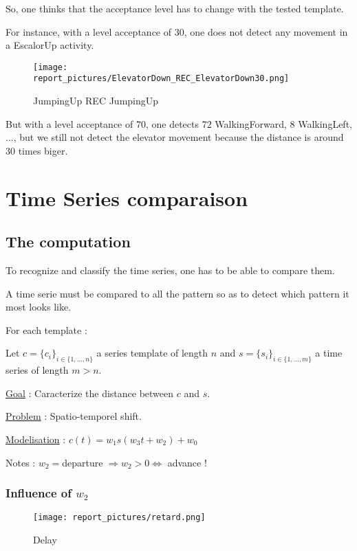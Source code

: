 \documentclass[a4,12pt]{article}
\begin{document}
	So, one thinks that the acceptance level has to change with the tested template. 
	
	For instance, with a level acceptance of $30$, one does not detect any movement in a EscalorUp activity.
	
	\begin{figure}[H]
		\centering
		\texttt{[image: report\_pictures/ElevatorDown\_REC\_ElevatorDown30.png]}
		\caption{JumpingUp REC JumpingUp}
		\label{JumpingUp_REC_JumpingUp}
	\end{figure}
	
	But with a level acceptance of $70$, one detects $72$ WalkingForward, $8$ WalkingLeft, ..., but we still not detect the elevator movement because the distance is around $30$ times biger.
	
	\section{Time Series comparaison}
	
	\subsection{The computation}
	
	To recognize and classify the time series, one has to be able to compare them.
	
	A time serie must be compared to all the pattern so as to detect which pattern it most looks like.
	
	For each template :
	
	Let $c=\{c_i\}_{ i \in \{1, ..., n\} }$ a series template of length $n$ and $s=\{s_i\}_{ i \in \{1, ..., m\} }$ a time series of length $m>n$.
	
	\underline{Goal} : Caracterize the distance between $c$ and $s$.
	
	\underline{Problem} : Spatio-temporel shift.
	
	\underline{Modelisation} : $c(t) = w_1 s(w_3 t + w_2) + w_0$
	
	Notes : $w_2=$departure $ \Rightarrow w_2 > 0 \Leftrightarrow $ advance !
	
	\subsubsection{Influence of $w_2$}
	
	\begin{figure}[H]
		\centering
		\texttt{[image: report\_pictures/retard.png]}
		\caption{Delay}
		\label{retard}
	\end{figure}
	
\end{document}
